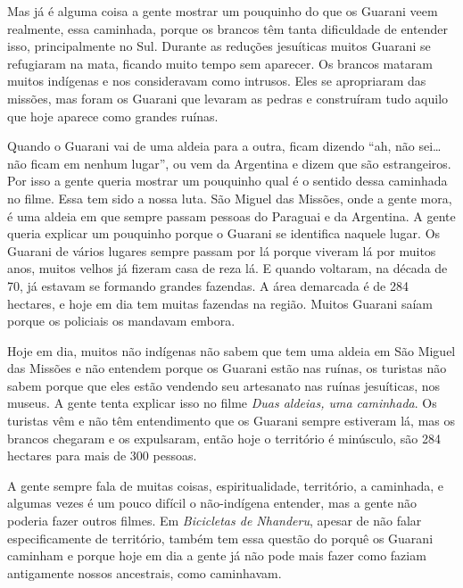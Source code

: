 {{Mas já é alguma coisa a gente mostrar um pouquinho do que os Guarani
veem realmente, essa caminhada, porque os brancos têm tanta dificuldade
de entender isso, principalmente no Sul. Durante as reduções jesuíticas
muitos Guarani se refugiaram na mata, ficando muito tempo sem
aparecer. Os brancos mataram muitos indígenas e nos consideravam como
intrusos. Eles se apropriaram das missões, mas foram os Guarani que
levaram as pedras e construíram tudo aquilo que hoje aparece como
grandes ruínas.

Quando o Guarani vai de uma aldeia para a outra, ficam dizendo ``ah, não
sei\ldots{} não ficam em nenhum lugar'', ou vem da Argentina e dizem que são
estrangeiros. Por isso a gente queria mostrar um pouquinho qual é o
sentido dessa caminhada no filme. Essa tem sido a nossa luta. São
Miguel das Missões, onde a gente mora, é uma aldeia em que sempre
passam pessoas do Paraguai e da Argentina. A gente queria explicar um
pouquinho porque o Guarani se identifica naquele lugar. Os Guarani de
vários lugares sempre passam por lá porque viveram lá por muitos anos,
muitos velhos já fizeram casa de reza lá. E quando voltaram, na década
de 70, já estavam se formando grandes fazendas. A área demarcada é de
284 hectares, e hoje em dia tem muitas fazendas na região. Muitos
Guarani saíam porque os policiais os mandavam embora.

Hoje em dia, muitos não indígenas não sabem que tem uma aldeia em São
Miguel das Missões e não entendem porque os Guarani estão nas ruínas,
os turistas não sabem porque que eles estão vendendo seu artesanato nas
ruínas jesuíticas, nos museus. A gente tenta explicar isso no filme
\emph{Duas aldeias, uma caminhada}. Os turistas vêm e não têm entendimento que
os Guarani sempre estiveram lá, mas os brancos chegaram e os
expulsaram, então hoje o território é minúsculo, são 284 hectares para
mais de 300 pessoas.

A gente sempre fala de muitas coisas, espiritualidade, território, a
caminhada, e algumas vezes é um pouco difícil o não-indígena entender,
mas a gente não poderia fazer outros filmes. Em \emph{Bicicletas de Nhanderu},
apesar de não falar especificamente de território, também tem essa
questão do porquê os Guarani caminham e porque hoje em dia a gente já
não pode mais fazer como faziam antigamente nossos ancestrais, como
caminhavam.

}}
